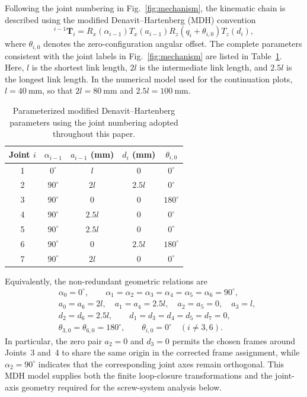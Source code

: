﻿\documentclass[a4paper,fleqn]{cas-sc}
\begin{document}
Following the joint numbering in Fig.~\ref{fig:mechanism}, the kinematic
chain is described using the modified Denavit--Hartenberg (MDH) convention
\begin{equation}
{}^{i-1}\mathbf T_i=
R_x(\alpha_{i-1})T_x(a_{i-1})
R_z(q_i+\theta_{i,0})T_z(d_i),
\label{eq:mdh_transform}
\end{equation}
where \(\theta_{i,0}\) denotes the zero-configuration angular offset. The
complete parameters consistent with the joint labels in
Fig.~\ref{fig:mechanism} are listed in Table~\ref{tab:mdh_parameters}.
Here, \(l\) is the shortest link length, \(2l\) is the intermediate link
length, and \(2.5l\) is the longest link length. In the numerical model used
for the continuation plots, \(l=40~\mathrm{mm}\), so that \(2l=80~\mathrm{mm}\)
and \(2.5l=100~\mathrm{mm}\).

\begin{table}[htbp]
\centering
\caption{Parameterized modified Denavit--Hartenberg parameters using the
joint numbering adopted throughout this paper.}
\label{tab:mdh_parameters}
\begin{tabular}{ccccc}
\toprule
Joint \(i\) & \(\alpha_{i-1}\) & \(a_{i-1}\) (mm) &
\(d_i\) (mm) & \(\theta_{i,0}\)\\
\midrule
1 & \(0^\circ\)  & \(l\)     & \(0\)       & \(0^\circ\)\\
2 & \(90^\circ\) & \(2l\)    & \(2.5l\)    & \(0^\circ\)\\
3 & \(90^\circ\) & \(0\)     & \(0\)       & \(180^\circ\)\\
4 & \(90^\circ\) & \(2.5l\)  & \(0\)       & \(0^\circ\)\\
5 & \(90^\circ\) & \(2.5l\)  & \(0\)       & \(0^\circ\)\\
6 & \(90^\circ\) & \(0\)     & \(2.5l\)    & \(180^\circ\)\\
7 & \(90^\circ\) & \(2l\)    & \(0\)       & \(0^\circ\)\\
\bottomrule
\end{tabular}
\end{table}

Equivalently, the non-redundant geometric relations are
\begin{equation}
\begin{aligned}
&\alpha_0=0^\circ,\qquad
\alpha_1=\alpha_2=\alpha_3=\alpha_4=\alpha_5=\alpha_6=90^\circ,\\
&a_0=a_6=2l,\quad a_1=a_4=2.5l,\quad a_2=a_5=0,\quad a_3=l,\\
&d_2=d_6=2.5l,\qquad
 d_1=d_3=d_4=d_5=d_7=0,\\
&\theta_{3,0}=\theta_{6,0}=180^\circ,\qquad
\theta_{i,0}=0^\circ\quad(i\neq3,6).
\end{aligned}
\label{eq:design_parameters}
\end{equation}
In particular, the zero pair \(a_2=0\) and \(d_3=0\) permits the chosen
frames around Joints~3 and~4 to share the same origin in the corrected frame
assignment, while \(\alpha_2=90^\circ\) indicates that the corresponding
joint axes remain orthogonal. This MDH model supplies both the finite
loop-closure transformations and the joint-axis geometry required for the
screw-system analysis below.
\end{document}
